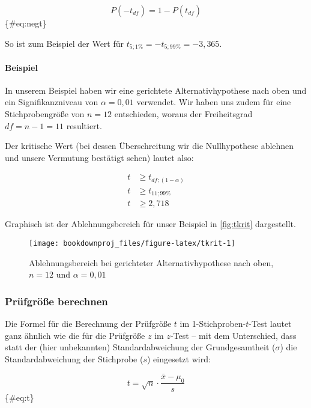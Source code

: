 \documentclass[
  ngerman,
]{article}
\begin{document}
\[
P(-t_\mathit{df})=1-P(t_\mathit{df})
\]\{\#eq:negt\}

So ist zum Beispiel der Wert für \(t_{5;1\%}=-t_{5;99\%}=-3{,}365\).

\hypertarget{beispiel-9}{%
\paragraph{Beispiel}\label{beispiel-9}}

In unserem Beispiel haben wir eine gerichtete Alternativhypothese nach oben und ein Signifikanzniveau von \(\alpha=0{,}01\) verwendet. Wir haben uns zudem für eine Stichprobengröße von \(n=12\) entschieden, woraus der Freiheitsgrad \(\mathit{df}=n-1=11\) resultiert.

Der kritische Wert (bei dessen Überschreitung wir die Nullhypothese ablehnen und unsere Vermutung bestätigt sehen) lautet also:

\[\begin{aligned}
t &\geq t_{\mathit{df};(1-\alpha)}\\[4pt]
t &\geq t_{11;99\%}\\[4pt]
t &\geq 2,718
\end{aligned}\]

Graphisch ist der Ablehnungsbereich für unser Beispiel in \autoref{fig:tkrit} dargestellt.

\begin{figure}[h]

{\centering \texttt{[image: bookdownproj\_files/figure-latex/tkrit-1]} 

}

\caption{Ablehnungsbereich bei gerichteter Alternativhypothese nach oben, $n=12$ und $\alpha=0{,}01$}\label{fig:tkrit}
\end{figure}

\hypertarget{pruxfcfgruxf6uxdfe-berechnen-1}{%
\subsubsection{Prüfgröße berechnen}\label{pruxfcfgruxf6uxdfe-berechnen-1}}

Die Formel für die Berechnung der Prüfgröße \(t\) im 1-Stichproben-\(t\)-Test lautet ganz ähnlich wie die für die Prüfgröße \(z\) im \(z\)-Test -- mit dem Unterschied, dass statt der (hier unbekannten) Standardabweichung der Grundgesamtheit (\(\sigma\)) die Standardabweichung der Stichprobe (\(s\)) eingesetzt wird:

\[
t=\sqrt{n}\cdot\frac{\bar{x}-\mu_0}{s}
\]\{\#eq:t\}
\end{document}
